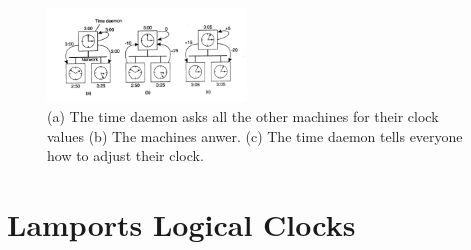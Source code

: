 \documentclass[ngerman,a4paper]{report}
\begin{document}
\begin{figure}[h]
	\centering
	\includegraphics[width=200px]{gfx/berkeley.png}
	\caption{(a) The time daemon asks all the other machines for their clock values (b) The machines anwer.  (c) The time daemon tells everyone how to adjust their clock.}
	\label{img:berkeley}
\end{figure}

\section{Lamports Logical Clocks}
\end{document}
